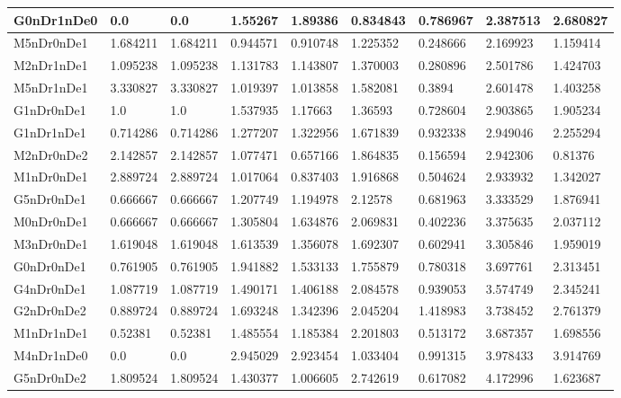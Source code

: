 \documentclass[../thesis.tex]{subfiles}
\begin{document}
\begin{table}[!ht]
\begin{tabular}{|l|l|l|l|l|l|l|l|l|}
        G0nDr1nDe0 & 0.0 & 0.0 & 1.55267 & 1.89386 & 0.834843 & 0.786967 & 2.387513 & 2.680827 \\ \hline
        M5nDr0nDe1 & 1.684211 & 1.684211 & 0.944571 & 0.910748 & 1.225352 & 0.248666 & 2.169923 & 1.159414 \\ \hline
        M2nDr1nDe1 & 1.095238 & 1.095238 & 1.131783 & 1.143807 & 1.370003 & 0.280896 & 2.501786 & 1.424703 \\ \hline
        M5nDr1nDe1 & 3.330827 & 3.330827 & 1.019397 & 1.013858 & 1.582081 & 0.3894 & 2.601478 & 1.403258 \\ \hline
        G1nDr0nDe1 & 1.0 & 1.0 & 1.537935 & 1.17663 & 1.36593 & 0.728604 & 2.903865 & 1.905234 \\ \hline
        G1nDr1nDe1 & 0.714286 & 0.714286 & 1.277207 & 1.322956 & 1.671839 & 0.932338 & 2.949046 & 2.255294 \\ \hline
        M2nDr0nDe2 & 2.142857 & 2.142857 & 1.077471 & 0.657166 & 1.864835 & 0.156594 & 2.942306 & 0.81376 \\ \hline
        M1nDr0nDe1 & 2.889724 & 2.889724 & 1.017064 & 0.837403 & 1.916868 & 0.504624 & 2.933932 & 1.342027 \\ \hline
        G5nDr0nDe1 & 0.666667 & 0.666667 & 1.207749 & 1.194978 & 2.12578 & 0.681963 & 3.333529 & 1.876941 \\ \hline
        M0nDr0nDe1 & 0.666667 & 0.666667 & 1.305804 & 1.634876 & 2.069831 & 0.402236 & 3.375635 & 2.037112 \\ \hline
        M3nDr0nDe1 & 1.619048 & 1.619048 & 1.613539 & 1.356078 & 1.692307 & 0.602941 & 3.305846 & 1.959019 \\ \hline
        G0nDr0nDe1 & 0.761905 & 0.761905 & 1.941882 & 1.533133 & 1.755879 & 0.780318 & 3.697761 & 2.313451 \\ \hline
        G4nDr0nDe1 & 1.087719 & 1.087719 & 1.490171 & 1.406188 & 2.084578 & 0.939053 & 3.574749 & 2.345241 \\ \hline
        G2nDr0nDe2 & 0.889724 & 0.889724 & 1.693248 & 1.342396 & 2.045204 & 1.418983 & 3.738452 & 2.761379 \\ \hline
        M1nDr1nDe1 & 0.52381 & 0.52381 & 1.485554 & 1.185384 & 2.201803 & 0.513172 & 3.687357 & 1.698556 \\ \hline
        M4nDr1nDe0 & 0.0 & 0.0 & 2.945029 & 2.923454 & 1.033404 & 0.991315 & 3.978433 & 3.914769 \\ \hline
        G5nDr0nDe2 & 1.809524 & 1.809524 & 1.430377 & 1.006605 & 2.742619 & 0.617082 & 4.172996 & 1.623687 \\ \hline

\end{tabular}
\end{table}
\end{document}

